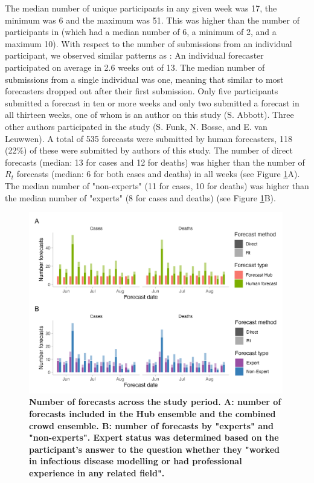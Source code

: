 \documentclass[10pt,a4paper,twocolumn]{article}
\begin{document}
The median number of unique participants in any given week was 17, the minimum was 6 and the maximum was 51. This was higher than the number of participants in \cite{bosseComparingHumanModelbased2022} (which had a median number of 6, a minimum of 2, and a maximum 10). With respect to the number of submissions from an individual participant, we observed similar patterns as \cite{bosseComparingHumanModelbased2022}: An individual forecaster participated on average in 2.6 weeks out of 13. The median number of submissions from a single individual was one, meaning that similar to \citep{bosseComparingHumanModelbased2022} most forecasters dropped out after their first submission. Only five participants submitted a forecast in ten or more weeks and only two submitted a forecast in all thirteen weeks, one of whom is an author on this study (S. Abbott). Three other authors participated in the study (S. Funk, N. Bosse, and E. van Leuwwen). A total of 535 forecasts were submitted by human forecasters, 118 (22\%) of these were submitted by authors of this study. The number of direct forecasts (median: 13 for cases and 12 for deaths) was higher than the number of $R_t$ forecasts (median: 6 for both cases and deaths) in all weeks (see Figure \ref{fig:num-forecasters}A). The median number of "non-experts" (11 for cases, 10 for deaths) was higher than the median number of "experts" (8 for cases and deaths) (see Figure \ref{fig:num-forecasters}B). 

\begin{figure}
\centering
\includegraphics[width=0.99\textwidth]{../output/figures/num-forecasters.png}
\caption{\bf{Number of forecasts across the study period.} A: number of forecasts included in the Hub ensemble and the combined crowd ensemble. B: number of forecasts by "experts" and "non-experts". Expert status was determined based on the participant's answer to the question whether they "worked in infectious disease modelling or had professional experience in any related field".}
\label{fig:num-forecasters}
\end{figure}
\end{document}
